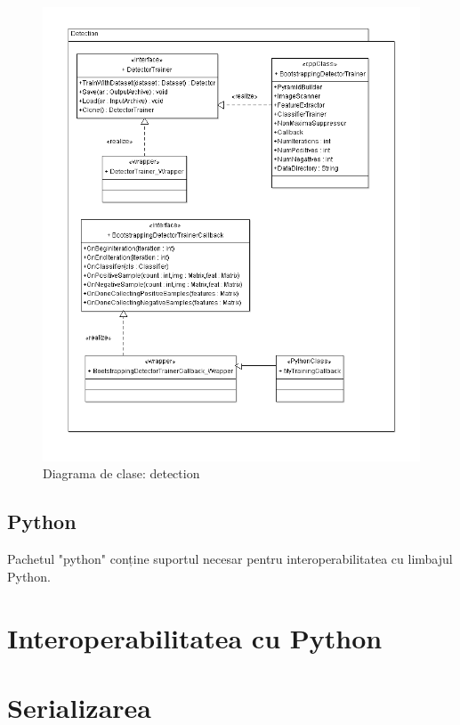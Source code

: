 \begin{figure}[h]
	\centering
		\includegraphics[width=1.00\textwidth]{uml/detection2ClassDiagram.png}
	\caption{Diagrama de clase: detection}
	\label{fig:detection2ClassDiagram}
\end{figure}

\subsection{Python}
Pachetul "python" conține suportul necesar pentru interoperabilitatea cu limbajul Python.



\pagebreak

\section{Interoperabilitatea cu Python}
\pagebreak

\section{Serializarea}
\pagebreak